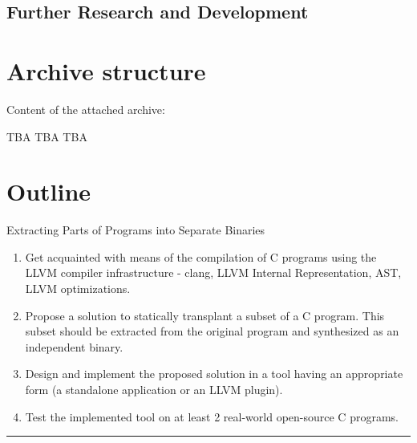 \documentclass[12pt, twoside]{fithesis2}
\renewcommand{\_}{\leavevmode \kern0.07em\vbox{\hrule width0.4em}}
\newenvironment{myEnumerate}{
  \begin{enumerate}[
    leftmargin=2em,
    rightmargin=1em,
    itemsep=\parskip,
    parsep=0em,
    topsep=0em,
    partopsep=0em
]
}{
  \end{enumerate}
}
\begin{document}
\section{Further Research and Development}
\label{sec:conclusions-next}



\appendix

\printbibliography

\chapter{Archive structure}
\label{appendix:archive}

Content of the attached archive:

TBA TBA TBA

\chapter{Outline}

Extracting Parts of Programs into Separate Binaries

\begin{myEnumerate}
\item Get acquainted with means of the compilation of C programs using the LLVM
compiler infrastructure - clang, LLVM Internal Representation, AST, LLVM
optimizations.
\item Propose a solution to statically transplant a subset of a C program. This
subset should be extracted from the original program and synthesized as an
independent binary.
\item Design and implement the proposed solution in a tool having an
appropriate form (a standalone application or an LLVM plugin).
\item Test the implemented tool on at least 2 real-world open-source C
programs.
\end{myEnumerate}

\noindent\rule{\textwidth}{1pt}
\end{document}
